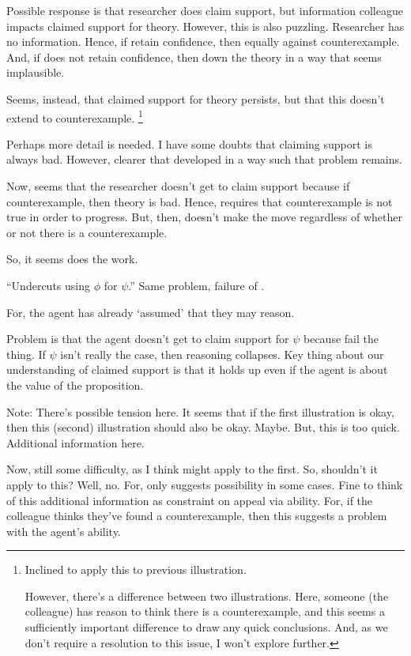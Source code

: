 \begin{note}
  Possible response is that researcher does claim support, but information colleague impacts claimed support for theory.
  However, this is also puzzling.
  Researcher has no information.
  Hence, if retain confidence, then equally against counterexample.
  And, if does not retain confidence, then down the theory in a way that seems implausible.

  Seems, instead, that claimed support for theory persists, but that this doesn't extend to counterexample.\nolinebreak
  \footnote{
    Inclined to apply this to previous illustration.

    However, there's a difference between two illustrations.
    Here, someone (the colleague) has reason to think there is a counterexample, and this seems a sufficiently important difference to draw any quick conclusions.
    And, as we don't require a resolution to this issue, I won't explore further.
  }

  Perhaps more detail is needed.
  I have some doubts that claiming support is always bad.
  However, clearer that developed in a way such that problem remains.

  Now, seems that the researcher doesn't get to claim support because if counterexample, then theory is bad.
  Hence, requires that counterexample is not true in order to progress.
  But, then, doesn't make the move regardless of whether or not there is a counterexample.

  So, it seems \ideaCS{} does the work.
\end{note}


\begin{note}
  ``Undercuts using \(\phi\) for \(\psi\).''
  Same problem, failure of \ideaCS{}.

  For, the agent has already `assumed' that they may reason.

  Problem is that the agent doesn't get to claim support for \(\psi\) because fail the \ideaCS{} thing.
  If \(\psi\) isn't really the case, then reasoning collapses.
  Key thing about our understanding of claimed support is that it holds up even if the agent is \mom{} about the value of the proposition.

  {
    \color{red}
    Note:
    There's possible tension here.
    It seems that if the first illustration is okay, then this (second) illustration should also be okay.
    Maybe.
    But, this is too quick.
    Additional information here.

    Now, still some difficulty, as I think \EAS{} might apply to the first.
    So, shouldn't it apply to this?
    Well, no.
    For, \EAS{} only suggests possibility in some cases.
    Fine to think of this additional information as constraint on appeal via ability.
    For, if the colleague thinks they've found a counterexample, then this suggests a problem with the agent's ability.
  }
\end{note}

